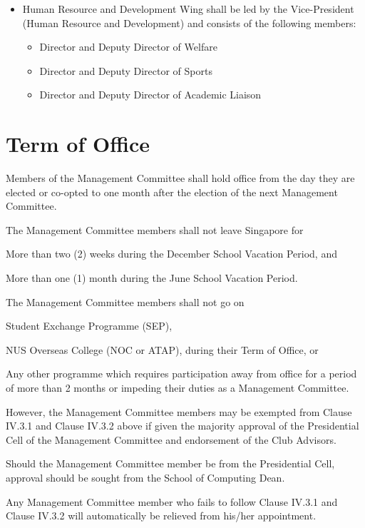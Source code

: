\begin{itemize}
	\item Human Resource and Development Wing shall be led by the Vice-President (Human Resource and Development) and consists of the following members:
		\begin{itemize}
		\item Director and Deputy Director of Welfare
		\item Director and Deputy Director of Sports
		\item Director and Deputy Director of Academic Liaison
		\end{itemize}
	\end{itemize}

\section{Term of Office}
Members of the Management Committee shall hold office from the day they are elected or co-opted to one month after the election of the next Management Committee.
	\begin{legal}
	\item The Management Committee members shall not leave Singapore for
		\begin{legal}
		\item More than two (2) weeks during the December School Vacation Period, and
		\item More than one (1) month during the June School Vacation Period.
		\end{legal}
	
	\item The Management Committee members shall not go on
		\begin{legal}
		\item Student Exchange Programme (SEP),
		\item NUS Overseas College (NOC or ATAP), during their Term of Office, or
		\item Any other programme which requires participation away from office for a period of more than 2 months or impeding their duties as a Management Committee.
		\end{legal}
	
	\item However, the Management Committee members may be exempted from Clause IV.3.1 and Clause IV.3.2 above if given the majority approval of the Presidential Cell of the Management Committee and endorsement of the Club Advisors.
		\begin{legal}
		\item Should the Management Committee member be from the Presidential Cell, approval should be sought from the School of Computing Dean.
		\item Any Management Committee member who fails to follow Clause IV.3.1 and Clause IV.3.2 will automatically be relieved from his/her appointment.
		\end{legal}
	\end{legal}

